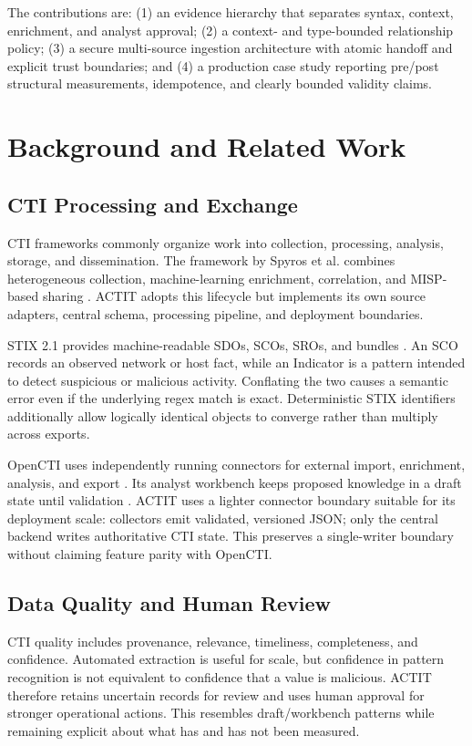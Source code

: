\documentclass[conference]{IEEEtran}
\begin{document}
The contributions are: (1) an evidence hierarchy that separates syntax, context, enrichment, and analyst approval; (2) a context- and type-bounded relationship policy; (3) a secure multi-source ingestion architecture with atomic handoff and explicit trust boundaries; and (4) a production case study reporting pre/post structural measurements, idempotence, and clearly bounded validity claims.

\section{Background and Related Work}
\subsection{CTI Processing and Exchange}
CTI frameworks commonly organize work into collection, processing, analysis, storage, and dissemination. The framework by Spyros et al. combines heterogeneous collection, machine-learning enrichment, correlation, and MISP-based sharing \cite{spyros2025holistic}. ACTIT adopts this lifecycle but implements its own source adapters, central schema, processing pipeline, and deployment boundaries.

STIX 2.1 provides machine-readable SDOs, SCOs, SROs, and bundles \cite{oasis2021stix}. An SCO records an observed network or host fact, while an Indicator is a pattern intended to detect suspicious or malicious activity. Conflating the two causes a semantic error even if the underlying regex match is exact. Deterministic STIX identifiers additionally allow logically identical objects to converge rather than multiply across exports.

OpenCTI uses independently running connectors for external import, enrichment, analysis, and export \cite{openctiConnectors}. Its analyst workbench keeps proposed knowledge in a draft state until validation \cite{openctiWorkbench}. ACTIT uses a lighter connector boundary suitable for its deployment scale: collectors emit validated, versioned JSON; only the central backend writes authoritative CTI state. This preserves a single-writer boundary without claiming feature parity with OpenCTI.

\subsection{Data Quality and Human Review}
CTI quality includes provenance, relevance, timeliness, completeness, and confidence. Automated extraction is useful for scale, but confidence in pattern recognition is not equivalent to confidence that a value is malicious. ACTIT therefore retains uncertain records for review and uses human approval for stronger operational actions. This resembles draft/workbench patterns while remaining explicit about what has and has not been measured.
\end{document}
